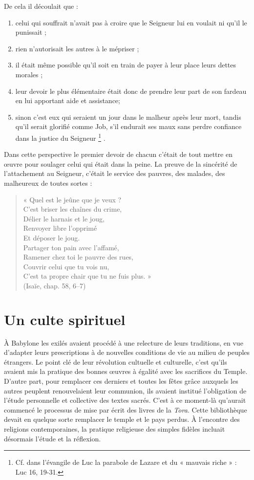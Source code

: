 De cela il découlait que :
\begin{enumerate}
\item celui qui souffrait n'avait pas à croire que le Seigneur lui en voulait ni qu'il le punissait ;
\item rien n'autorisait les autres à le mépriser ;
\item il était même possible qu'il soit en train de payer à leur place leurs dettes morales ;
\item leur devoir le plus élémentaire était donc de prendre leur part de son fardeau en lui apportant aide et assistance;
\item sinon c'est eux qui seraient un jour dans le malheur après leur mort, tandis qu'il serait glorifié comme Job, s'il endurait ses maux sans perdre confiance dans la justice du Seigneur%
\footnote{Cf. dans l'évangile de Luc la parabole de Lazare et du « mauvais riche » : Luc 16, 19-31.}%
.
\end{enumerate}

 Dans cette perspective le premier devoir de chacun c'était de tout mettre en œuvre pour soulager celui qui était dans la peine. La preuve de la sincérité de l'attachement au Seigneur, c'était le service des pauvres, des malades, des malheureux de toutes sortes :

\begin{verse}
 « {Quel est le jeûne que je veux ? \\
 C'est briser les chaînes du crime, \\
 Délier le harnais et le joug, \\
 Renvoyer libre l'opprimé \\
 Et déposer le joug. \\
 Partager ton pain avec l'affamé, \\
 Ramener chez toi le pauvre des rues, \\
 Couvrir celui que tu vois nu, \\
 C'est ta propre chair que tu ne fuis plus.} » \\
 (Isaïe, chap. 58, 6--7)
\end{verse}

 
\section{Un culte spirituel}

 À Babylone les exilés avaient procédé à une relecture de leurs traditions, en vue d'adapter leurs prescriptions à de nouvelles conditions de vie au milieu de peuples étrangers. Le point clé de leur révolution cultuelle et culturelle, c'est qu'ils avaient mis la pratique des bonnes œuvres à égalité avec les sacrifices du Temple. D'autre part, pour remplacer ces derniers et toutes les fêtes grâce auxquels les autres peuplent renouvelaient leur communion, ils avaient institué l'obligation de l'étude personnelle et collective des textes sacrés. C'est à ce moment-là qu'aurait commencé le processus de mise par écrit des livres de la \emph{Tora}. Cette bibliothèque devait en quelque sorte remplacer le temple et le pays perdus. À l'encontre des religions contemporaines, la pratique religieuse des simples fidèles incluait désormais l'étude et la réflexion. 

